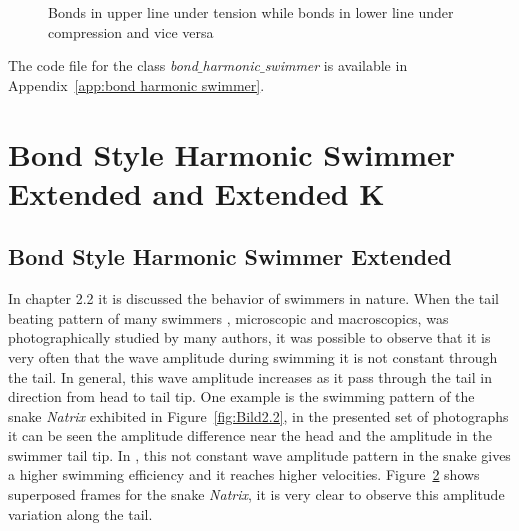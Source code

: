 \begin{figure}[H]
\centering
  \begin{footnotesize}
  
  \caption[Bonds in upper line under tension while bonds in lower line under compression and vice versa]{Bonds in upper line under tension while bonds in lower line under compression and vice versa}
  \label{fig:Bild3.4}
  \end{footnotesize}
\end{figure} 

The code file for the class \textit{bond$\_$harmonic$\_$swimmer} is available in Appendix~\ref{app:bond harmonic swimmer}. 

\section{Bond Style Harmonic Swimmer Extended and Extended K}
\label{sec:section 4}

\subsection{Bond Style Harmonic Swimmer Extended }
\label{sec:section 1}

In chapter 2.2 it is discussed the behavior of swimmers in nature. When the tail beating pattern of many swimmers , microscopic and macroscopics, was photographically studied
by many authors, it was possible to observe that it is very often that the wave amplitude during swimming it is not constant through the tail. In general, this wave amplitude increases
as it pass through the tail in direction from head to tail tip. One example is the swimming pattern of the snake \textit{Natrix} exhibited in Figure~\ref{fig:Bild2.2}, in the presented set
of photographs it can be seen the amplitude difference near the head and the amplitude in the swimmer tail tip. In \cite{taylor_analysis_1952}, this not constant wave amplitude
pattern in the snake gives a higher swimming efficiency and it reaches higher velocities. Figure~\ref{fig:Bild3.5} shows superposed frames for the snake \textit{Natrix}, it is very
clear to observe this amplitude variation along the tail.\par

\begin{figure}[H]
\centering
  \begin{footnotesize}
  
  \caption[]{}
  \label{fig:Bild3.5}
  \end{footnotesize}
\end{figure} 

